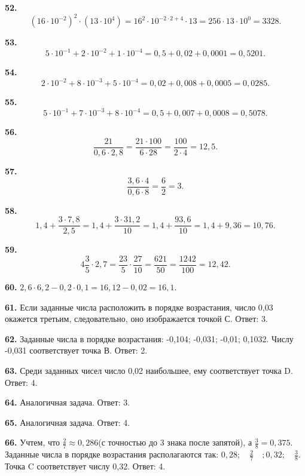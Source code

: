\textbf{52.} $$\left(16\cdot10^{-2}\right)^2\cdot\left(13\cdot10^4\right)=16^2\cdot10^{-2\cdot2+4}\cdot13=256\cdot13\cdot10^0=3328.$$

\textbf{53.} $$5\cdot10^{-1}+2\cdot10^{-2}+1\cdot10^{-4}=0,5+0,02+0,0001=0,5201.$$

\textbf{54.} $$2\cdot10^{-2}+8\cdot10^{-3}+5\cdot10^{-4}=0,02+0,008+0,0005=0,0285.$$

\textbf{55.} $$5\cdot10^{-1}+7\cdot10^{-3}+8\cdot10^{-4}=0,5+0,007+0,0008=0,5078.$$

\textbf{56.} $$\frac{21}{0,6\cdot2,8}=\frac{21\cdot100}{6\cdot28}=\frac{100}{2\cdot4}=12,5.$$

\newpage \textbf{57.} $$\frac{3,6\cdot4}{0,6\cdot8}=\frac{6}{2}=3.$$

\textbf{58.} $$1,4+\frac{3\cdot7,8}{2,5}=1,4+\frac{3\cdot31,2}{10}=1,4+\frac{93,6}{10}=1,4+9,36=10,76.$$

\textbf{59.} $$4\frac{3}{5}\cdot2,7=\frac{23}{5}\cdot\frac{27}{10}=\frac{621}{50}=\frac{1242}{100}=12,42.$$

\textbf{60.} $2,6\cdot6,2-0,2\cdot0,1=16,12-0,02=16,1.$

\textbf{61.}  Если заданные числа расположить в порядке возрастания, число 0,03 окажется третьим, следовательно, оно изображается точкой С. \newline \null \hspace*{\fill} Ответ: 3. 


\textbf{62.}  Заданные числа в порядке возрастания: -0,104; -0,031; -0,01; 0,1032. Числу -0,031 соответствует точка В. \newline \null \hspace*{\fill} Ответ: 2. 

\textbf{63.}  Среди заданных чисел число 0,02 наибольшее, ему соответствует точка D. \newline \null \hspace*{\fill} Ответ: 4. 

\textbf{64.}  Аналогичная задача. \newline \null \hspace*{\fill} Ответ: 3. 

\textbf{65.}  Аналогичная задача. \newline \null \hspace*{\fill} Ответ: 4. 

\textbf{66.}  Учтем, что $\frac{2}{7}\approx0,286$(с точностью до 3 знака после запятой), а $\frac{3}{8}=0,375$. Заданные числа  в порядке возрастания располагаются так: $0,28;\quad\frac{2}{7}\quad;0,32;\quad\frac{3}{8}$. Точка C соответствует числу 0,32. \newline \null \hspace*{\fill} Ответ: 4. 


